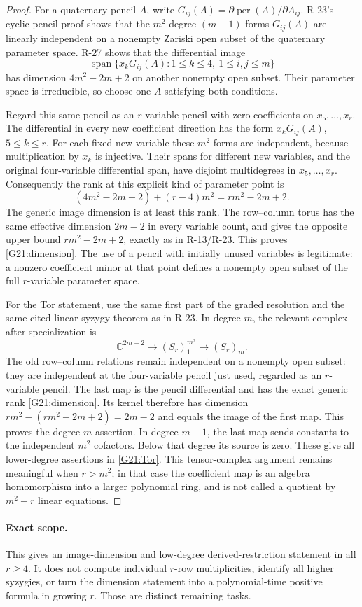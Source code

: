 \begin{proof}
For a quaternary pencil $A$, write
$G_{ij}(A)=\partial\operatorname{per}(A)/\partial A_{ij}$.
R-23's cyclic-pencil proof shows that the $m^2$ degree-$(m-1)$
forms $G_{ij}(A)$ are linearly independent on a nonempty
Zariski open subset of the quaternary parameter space. R-27
shows that the differential image
\[
 \operatorname{span}\{x_kG_{ij}(A):1\le k\le4,\ 1\le i,j\le m\}
\]
has dimension $4m^2-2m+2$ on another nonempty open subset.
Their parameter space is irreducible, so choose one $A$
satisfying both conditions.

Regard this same pencil as an $r$-variable pencil with zero
coefficients on $x_5,\ldots,x_r$. The differential in every
new coefficient direction has the form $x_kG_{ij}(A)$,
$5\le k\le r$. For each fixed new variable these $m^2$ forms
are independent, because multiplication by $x_k$ is injective.
Their spans for different new variables, and the original
four-variable differential span, have disjoint multidegrees
in $x_5,\ldots,x_r$. Consequently the rank at this explicit
kind of parameter point is
\[
 (4m^2-2m+2)+(r-4)m^2=rm^2-2m+2.
\]
The generic image dimension is at least this rank. The
row--column torus has the same effective dimension $2m-2$
in every variable count, and gives the opposite upper bound
$rm^2-2m+2$, exactly as in R-13/R-23. This proves
\eqref{G21:dimension}. The use of a pencil with initially
unused variables is legitimate: a nonzero coefficient minor
at that point defines a nonempty open subset of the full
$r$-variable parameter space.

For the Tor statement, use the same first part of the graded
resolution and the same cited linear-syzygy theorem as in
R-23. In degree $m$, the relevant complex after specialization is
\[
 \mathbb C^{2m-2}\longrightarrow (S_r)_1^{m^2}
       \longrightarrow (S_r)_m.
\]
The old row--column relations remain independent on a nonempty
open subset: they are independent at the four-variable pencil
just used, regarded as an $r$-variable pencil. The last map
is the pencil differential and has the exact generic rank
\eqref{G21:dimension}. Its kernel therefore has dimension
$rm^2-(rm^2-2m+2)=2m-2$ and equals the image of the first
map. This proves the degree-$m$ assertion.
In degree $m-1$, the last map sends constants to the independent
$m^2$ cofactors. Below that degree its source is zero. These
give all lower-degree assertions in \eqref{G21:Tor}.
This tensor-complex argument remains meaningful when $r>m^2$;
in that case the coefficient map is an algebra homomorphism
into a larger polynomial ring, and is not called a quotient
by $m^2-r$ linear equations.
\end{proof}

\paragraph{Exact scope.}
This gives an image-dimension and low-degree derived-restriction
statement in all $r\ge4$. It does not compute individual
$r$-row multiplicities, identify all higher syzygies, or
turn the dimension statement into a polynomial-time positive
formula in growing $r$. Those are distinct remaining tasks.
